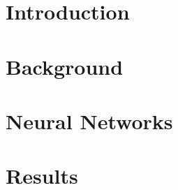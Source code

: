 


	
	\linenumbers
	\newpage
	\tableofcontents
	\newpage
	\section{Introduction}
	

	\section{Background}
	

	\section{Neural Networks}
	

	\section{Results}
	

	\newpage
	
	

